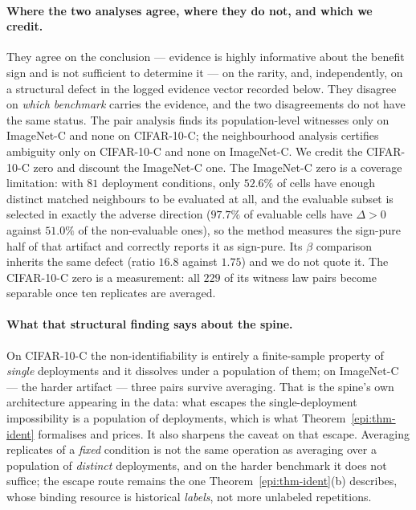 \paragraph{Where the two analyses agree, where they do not, and which we credit.} They agree on the
conclusion --- evidence is highly informative about the benefit sign and is not sufficient to
determine it --- on the rarity, and, independently, on a structural defect in the logged evidence
vector recorded below. They disagree on \emph{which benchmark} carries the evidence, and the two
disagreements do not have the same status. The pair analysis finds its population-level witnesses
only on ImageNet-C and none on CIFAR-10-C; the neighbourhood analysis certifies ambiguity only on
CIFAR-10-C and none on ImageNet-C. We credit the CIFAR-10-C zero and discount the ImageNet-C one.
The ImageNet-C zero is a coverage limitation: with $81$ deployment conditions, only $52.6\%$ of
cells have enough distinct matched neighbours to be evaluated at all, and the evaluable subset is
selected in exactly the adverse direction ($97.7\%$ of evaluable cells have $\Delta>0$ against
$51.0\%$ of the non-evaluable ones), so the method measures the sign-pure half of that artifact and
correctly reports it as sign-pure. Its $\beta$ comparison inherits the same defect (ratio $16.8$
against $1.75$) and we do not quote it. The CIFAR-10-C zero is a measurement: all $229$ of its
witness law pairs become separable once ten replicates are averaged.

\paragraph{What that structural finding says about the spine.} On CIFAR-10-C the
non-identifiability is entirely a finite-sample property of \emph{single} deployments and it
dissolves under a population of them; on ImageNet-C --- the harder artifact --- three pairs survive
averaging. That is the spine's own architecture appearing in the data: what escapes the
single-deployment impossibility is a population of deployments, which is what
Theorem~\ref{epi:thm-ident} formalises and prices. It also sharpens the caveat on that escape.
Averaging replicates of a \emph{fixed} condition is not the same operation as averaging over a
population of \emph{distinct} deployments, and on the harder benchmark it does not suffice; the
escape route remains the one Theorem~\ref{epi:thm-ident}(b) describes, whose binding resource is
historical \emph{labels}, not more unlabeled repetitions.

